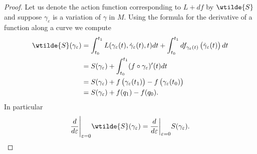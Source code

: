 \begin{proof}
	Let us denote the action function corresponding to $L + df$ by $\wtilde{S}$ and suppose $\gamma_\varepsilon$ is a variation of $\gamma$ in $M$. Using the formula for the derivative of a function along a curve \cite[283]{lee:smooth_manifolds:2013} we compute
	\begin{align*}
		\wtilde{S}(\gamma_\varepsilon) &= \int_{t_0}^{t_1}L(\gamma_\varepsilon(t),\dot{\gamma}_\varepsilon(t),t)dt + \int_{t_0}^{t_1}df_{\gamma_\varepsilon(t)}\del[1]{\dot{\gamma}_\varepsilon(t)}dt\\
		&= S(\gamma_\varepsilon) + \int_{t_0}^{t_1}(f \circ \gamma_\varepsilon)'(t)dt\\
		&= S(\gamma_\varepsilon) + f\del[1]{\gamma_\varepsilon(t_1)} - f\del[1]{\gamma_{\varepsilon}(t_0)}\\
		&= S(\gamma_\varepsilon) + f(q_1) - f(q_0).
	\end{align*}
	In particular
	\begin{equation*}
		\frac{d}{d\varepsilon}\Bigg\vert_{\varepsilon = 0}\wtilde{S}(\gamma_\varepsilon) = \frac{d}{d\varepsilon}\bigg\vert_{\varepsilon = 0}S(\gamma_\varepsilon).
	\end{equation*}
\end{proof}


